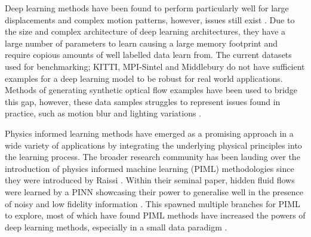 \IEEEPARstart{}{} Deep learning methods have been found to perform particularly well for large displacements and complex motion patterns, however, issues still exist \cite{ilg2017flownet}. Due to the size and complex architecture of deep learning architectures, they have a large number of parameters to learn causing a large memory footprint and require copious amounts of well labelled data learn from. The current datasets used for benchmarking; KITTI, MPI-Sintel and Middlebury do not have sufficient examples for a deep learning model to be robust for real world applications. Methods of generating synthetic optical flow examples have been used to bridge this gap, however, these data samples struggles to represent issues found in practice, such as motion blur and lighting variations \cite{nikolenko2021synthetic}.

\IEEEPARstart{}{} Physics informed learning methods have emerged as a promising approach in a wide variety of applications by integrating the underlying physical principles into the learning process. The broader research community has been lauding over the introduction of physics informed machine learning (PIML) methodologies since they were introduced by Raissi \cite{raissi2017physics}. Within their seminal paper, hidden fluid flows were learned by a PINN showcasing their power to generalise well in the presence of noisy and low fidelity information \cite{raissi2018hidden}. This spawned multiple branches for PIML to explore, most of which have found PIML methods have increased the powers of deep learning methods, especially in a small data paradigm \cite{karniadakis2021physics}. 

